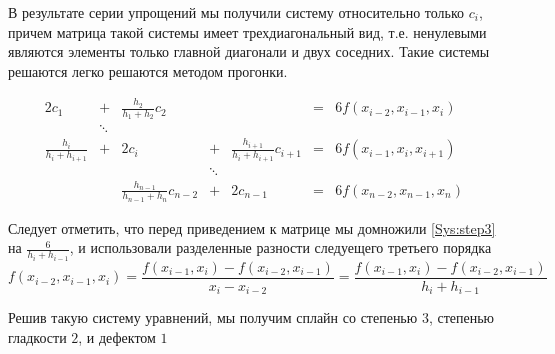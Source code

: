 В результате серии упрощений мы получили систему относительно только $c_i$, причем матрица такой системы имеет трехдиагональный вид, т.е. ненулевыми являются элементы только главной диагонали и двух соседних. Такие системы решаются легко решаются методом прогонки.

\begingroup
\Large
\begin{equation*}
\begin{array}{cccccccr}
2c_{1} & + & \frac{h_2}{h_1+h_2} c_2 & & & = & 6f(x_{i-2}, x_{i-1}, x_i) \\
 & \ddots & & & & & & \\
\frac{h_i} {h_i + h_{i+1}} & + & 2 c_i & + & \frac{h_{i+1}}{h_i + h_{i+1}} c_{i+1} & = & 6f(x_{i-1}, x_i, x_{i+1}) \\
 & & & \ddots & & & & \\
 & & \frac{h_{n-1}}{h_{n-1} + h_{n}} c_{n-2} & + & 2c_{n-1} & = & 6f(x_{n-2}, x_{n-1}, x_n)
\end{array}
\end{equation*}
\endgroup

Следует отметить, что перед приведением к матрице мы домножили \eqref{Sys:step3} на $\frac{6} {h_i +h_{i-1}}$, и использовали разделенные разности следуещего третьего порядка $$f(x_{i-2},x_{i-1},x_i) = \frac{f(x_{i-1}, x_i) - f(x_{i-2}, x_{i-1})}{x_i - x_{i-2}}= \frac{f(x_{i-1}, x_i) - f(x_{i-2}, x_{i-1})}{h_i + h_{i-1}}$$

Решив такую систему уравнений, мы получим сплайн со степенью $3$, степенью гладкости $2$, и дефектом $1$
